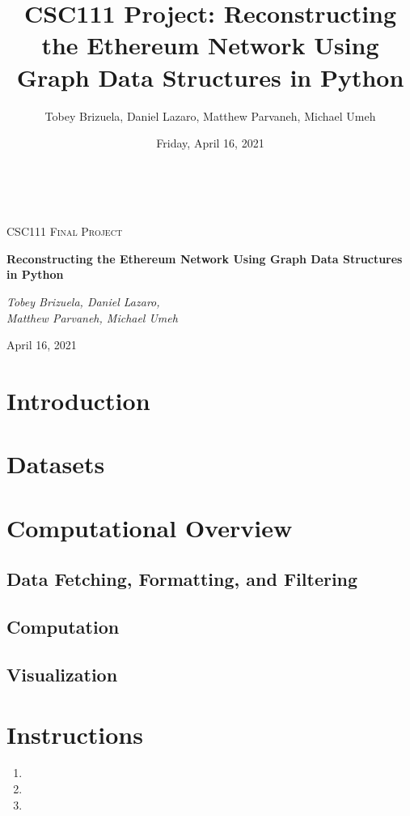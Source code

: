 \documentclass[fontsize=11pt]{article}
\title{CSC111 Project: Reconstructing the Ethereum Network Using Graph Data Structures in Python}
\author{Tobey Brizuela, Daniel Lazaro, Matthew Parvaneh, Michael Umeh}
\date{Friday, April 16, 2021}
\begin{document}
\begin{titlepage}
	\centering
	{\large \ \par}
	\vspace{2.25in}
	{\scshape\LARGE CSC111 Final Project \par}
	\vspace{.25in}
	{\huge\bfseries Reconstructing the Ethereum Network Using Graph Data Structures in Python\par}
	\vspace{3in}
	{\Large\itshape Tobey Brizuela, Daniel Lazaro, \\Matthew Parvaneh, Michael Umeh\par}
	\vspace{.5in}
	{\large April 16, 2021\par}
	\vfill
\end{titlepage}

\section*{Introduction}

\section*{Datasets}

\section*{Computational Overview}

\subsection*{Data Fetching, Formatting, and Filtering}

\subsection*{Computation}

\subsection*{Visualization}

\section*{Instructions}

\begin{enumerate}
    \item
    \item
    \item
\end{enumerate}
\end{document}
